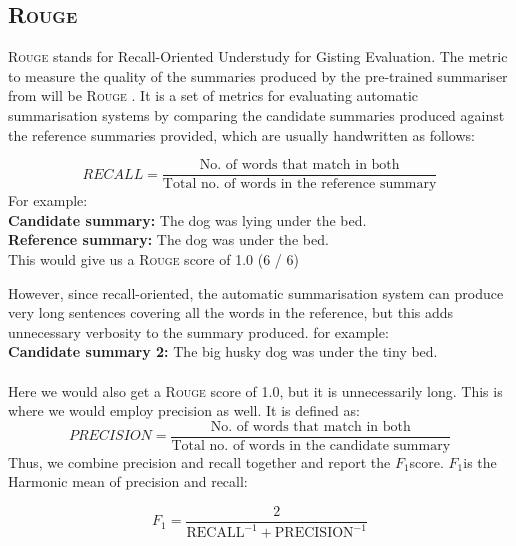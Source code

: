 \documentclass[12pt,a4paper,twoside,openright]{report}
\newcommand{\rouge}{\textsc{Rouge} }
\newcommand{\changedFont}[1]{{\fontfamily{qcr}\selectfont #1}}
\newcommand{\fone}{$F_1$}
\begin{document}
\subsection{\rouge}
\label{rouge}

\rouge stands for Recall-Oriented Understudy for Gisting Evaluation. The metric to measure the quality of the summaries produced by the pre-trained summariser from\cite{summary} will be \rouge. It is a set of metrics for evaluating automatic summarisation systems by comparing the candidate summaries produced against the reference summaries provided, which are usually handwritten as follows:

\[ RECALL = \frac{\text{No. of words that match in both}}{\text{Total no. of words in the reference summary}} \]
For example:\\
\textbf{Candidate summary:} \changedFont{The dog was lying under the bed.}\\
\textbf{Reference summary:} \changedFont{The dog was under the bed.}\\
This would give us a \rouge score of 1.0 (6 / 6)

However, since recall-oriented, the automatic summarisation system can produce very long sentences covering all the words in the reference, but this adds unnecessary verbosity to the summary produced. for example:\\
\textbf{Candidate summary 2: } \changedFont{The big husky dog was under the tiny bed.}
\\\\
Here we would also get a \rouge score of 1.0, but it is unnecessarily long.
This is where we would employ precision as well. It is defined as:
\[ PRECISION = \frac{\text{No. of words that match in both}}{\text{Total no. of words in the candidate summary}} \]
Thus, we combine precision and recall together and report the \fone score. \fone is the Harmonic mean of precision and recall:

\[ F_1 = \frac{2}{\text{RECALL}^{-1} + \text{PRECISION}^{-1}} \]
\end{document}

